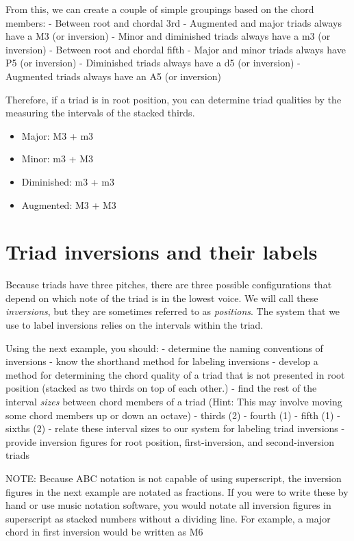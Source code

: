 \documentclass{book}
\providecommand{\tightlist}{%
  \setlength{\itemsep}{0pt}\setlength{\parskip}{0pt}}
\begin{document}
From this, we can create a couple of simple groupings based on the chord
members: - Between root and chordal 3rd - Augmented and major triads always
have a M3 (or inversion) - Minor and diminished triads always have a m3 (or
inversion) - Between root and chordal fifth - Major and minor triads always
have P5 (or inversion) - Diminished triads always have a d5 (or inversion) -
Augmented triads always have an A5 (or inversion)

Therefore, if a triad is in root position, you can determine triad qualities
by the measuring the intervals of the stacked thirds.

\begin{itemize}
\tightlist
\item
  Major: M3 + m3
\item
  Minor: m3 + M3
\item
  Diminished: m3 + m3
\item
  Augmented: M3 + M3
\end{itemize}

\hypertarget{triad-inversions-and-their-labels}{%
\section{Triad inversions and their
labels}\label{triad-inversions-and-their-labels}}

Because triads have three pitches, there are three possible configurations
that depend on which note of the triad is in the lowest voice. We will call
these \emph{inversions}, but they are sometimes referred to as
\emph{positions}. The system that we use to label inversions relies on the
intervals within the triad.

Using the next example, you should: - determine the naming conventions of
inversions - know the shorthand method for labeling inversions - develop a
method for determining the chord quality of a triad that is not presented in
root position (stacked as two thirds on top of each other.) - find the rest of
the interval \emph{sizes} between chord members of a triad (Hint: This may
involve moving some chord members up or down an octave) - thirds (2) - fourth
(1) - fifth (1) - sixths (2) - relate these interval sizes to our system for
labeling triad inversions - provide inversion figures for root position,
first-inversion, and second-inversion triads

NOTE: Because ABC notation is not capable of using superscript, the inversion
figures in the next example are notated as fractions. If you were to write
these by hand or use music notation software, you would notate all inversion
figures in superscript as stacked numbers without a dividing line. For
example, a major chord in first inversion would be written as M6
\end{document}
